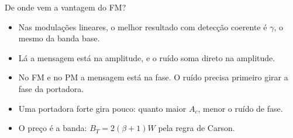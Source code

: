 \begin{frame}{De onde vem a vantagem do FM?}

\small
\begin{itemize}
\item<1-> Nas modulações lineares, o melhor resultado com detecção coerente é $\gamma$, o mesmo da banda base.
\item<2-> Lá a mensagem está na amplitude, e o ruído soma direto na amplitude.
\item<3-> No FM e no PM a mensagem está na fase. O ruído precisa primeiro girar a fase da portadora.
\item<4-> Uma portadora forte gira pouco: quanto maior $A_c$, menor o ruído de fase.
\item<5-> O preço é a banda: $B_T = 2(\beta + 1)W$ pela regra de Carson.
\end{itemize}

\vspace{0.3cm}

\end{frame}


